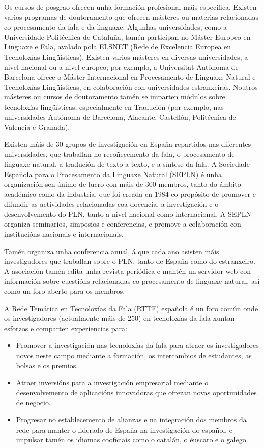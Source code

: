 \begin{multicols}{2}
Os cursos de posgrao ofrecen unha formación profesional máis específica. Existen varios programas de doutoramento que ofrecen másteres ou materias relacionadas co procesamento da fala e da linguaxe. Algunhas universidades, como a Universidade Politécnica de Cataluña, tamén participan no Máster Europeo en Linguaxe e Fala, avalado pola ELSNET (Rede de Excelencia Europea en Tecnoloxías Lingüísticas). Existen varios másteres en diversas universidades, a nivel nacional ou a nivel europeo; por exemplo, a Universitat Autònoma de Barcelona ofrece o Máster Internacional en Procesamento de Linguaxe Natural e Tecnoloxías Lingüísticas, en colaboración con universidades estranxeiras. Noutros másteres ou cursos de doutoramento tamén se imparten módulos sobre tecnoloxías lingüísticas, especialmente en Tradución (por exemplo, nas universidades Autónoma de Barcelona, Alacante, Castellón, Politécnica de Valencia e Granada).

Existen máis de 30 grupos de investigación en España repartidos nas diferentes universidades, que traballan no recoñecemento da fala, o procesamento de linguaxe natural, a tradución de texto a texto, e a síntese da fala. A Sociedade Española para o Procesamento da Linguaxe Natural (SEPLN) é unha organización sen ánimo de lucro con máis de 300 membros, tanto do ámbito académico como da industria, que foi creada en 1984 co propósito de promover e difundir as actividades relacionadas coa docencia, a investigación e o desenvolvemento do PLN, tanto a nivel nacional como internacional. A SEPLN organiza seminarios, simposios e conferencias, e promove a colaboración con institucións nacionais e internacionais.

Tamén organiza unha conferencia anual, á que cada ano asisten máis investigadores que traballan sobre o PLN, tanto de España como do estranxeiro. A asociación tamén edita unha revista periódica e mantén un servidor web con información sobre cuestións relacionadas co procesamento de linguaxe natural, así como un foro aberto para os membros.

A Rede Temática en Tecnoloxías da Fala (RTTF) española \cite{GAL-Nota34} é un foro común onde os investigadores (actualmente máis de 250) en tecnoloxías da fala xuntan esforzos e comparten experiencias para:
	\begin{itemize}
		\item Promover a investigación nas tecnoloxías da fala para atraer os investigadores novos neste campo mediante a formación, os intercambios de estudantes, as bolsas e os premios.
		\item Atraer inversións para a investigación empresarial mediante o desenvolvemento de aplicacións innovadoras que ofrezan novas oportunidades de negocio. 
		\item Progresar no establecemento de alianzas e na integración dos membros da rede para manter o liderado de España na investigación do español, e impulsar tamén os idiomas cooficiais como o catalán, o éuscaro e o galego.
	\end{itemize}


\end{multicols}
